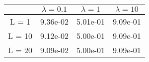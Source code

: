 \begin{tabular}{cccc}
& $\lambda = 0.1$ & $\lambda = 1$ & $\lambda = 10$ \\
\hline
L = 1 & 9.36e-02 & 5.01e-01 & 9.09e-01 \\
L = 10 & 9.12e-02 & 5.00e-01 & 9.09e-01 \\
L = 20 & 9.09e-02 & 5.00e-01 & 9.09e-01 \\
\hline
\end{tabular}
